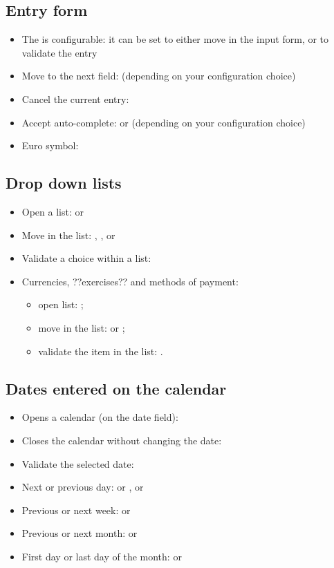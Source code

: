 \subsection{Entry form}

\begin{itemize}
	\item The  is configurable: it can be set to either move in the input form, or to validate the entry
	\item Move to the next field:  (depending on your configuration choice)
	\item Cancel the current entry: 
	\item Accept auto-complete:  or  (depending on your configuration choice)
	\item  Euro symbol: 
\end{itemize}

\subsection{Drop down lists}

\begin{itemize}
	 \item Open a list:  or 
	 \item Move in the list: , ,  or 
	 \item Validate a choice within a list: 
	 \item Currencies, ??exercises?? and methods of payment:
		\begin{itemize}
			\item open list: ; 
			\item move in the list:  or ;
			\item validate the item in the list: .
		\end{itemize}
\end{itemize}


\subsection{Dates entered on the calendar}

\begin{itemize}
	\item Opens a calendar (on the date field): 
	\item Closes the calendar without changing the date: 
	\item Validate the selected date: 
	\item Next or previous day: \key{+} or \key{-},  or 
	\item Previous or next week:  or 
	\item Previous or next month:  or 
	\item First day or last day of the month:  or 
\end{itemize}


